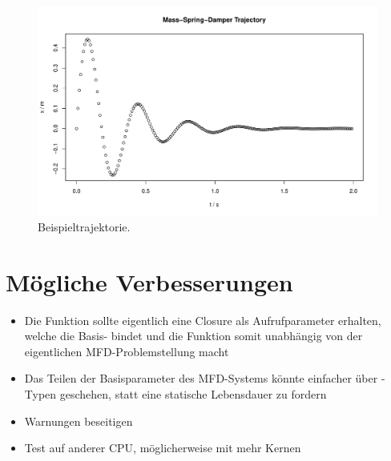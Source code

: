 \documentclass[10pt, a4paper]{article}
\begin{document}
\begin{figure}[h]
  \begin{center}
    \includegraphics[width=\textwidth]{graphics/trajectory.pdf}
  \end{center}
  \caption{Beispieltrajektorie.}\label{fig:trajectory}
\end{figure}




\section{Mögliche Verbesserungen}
\begin{itemize}
  \item Die Funktion  sollte eigentlich eine Closure als Aufrufparameter erhalten, welche die Basis- bindet und die Funktion somit unabhängig von der eigentlichen MFD-Problemstellung macht
  \item Das Teilen der Basisparameter des MFD-Systems könnte einfacher über -Typen geschehen, statt eine statische Lebensdauer zu fordern
  \item Warnungen beseitigen
  \item Test auf anderer CPU, möglicherweise mit mehr Kernen
\end{itemize}






%
\end{document}
